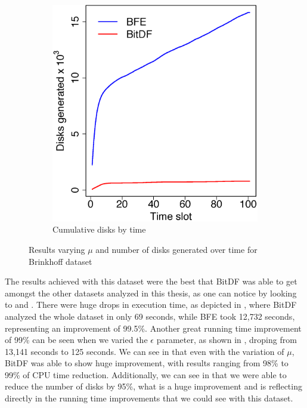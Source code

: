 \begin{figure}[h!]
\begin{subfigure}[t]{0.48\textwidth}
        \includegraphics[width=\textwidth]{images/Brinkhoff_d.eps}
        \caption{Cumulative disks by time}
        \label{fig:brinkhoff_disks}
    \end{subfigure}
    \caption{Results varying $\mu$ and number of disks generated over time for Brinkhoff dataset}
    \label{fig:brinkhoff_results2}
\end{figure}

The results achieved with this dataset were the best that BitDF was able to get amongst the other datasets analyzed in
this thesis, as one can notice by looking to  and . There
were huge drops in execution time, as depicted in , where BitDF analyzed the whole dataset
in only 69 seconds, while BFE took 12,732 seconds, representing an improvement of 99.5\%. Another great running time
improvement of 99\% can be seen when we varied the $\epsilon$ parameter, as shown in ,
droping from 13,141 seconds to 125 seconds. We can see in  that even with the variation of
$\mu$, BitDF was able to show huge improvement, with results ranging from 98\% to 99\% of CPU time reduction.
Additionally, we can see in  that we were able to reduce the number of disks by 95\%, what
is a huge improvement and is reflecting directly in the running time improvements that we could see with this dataset.
